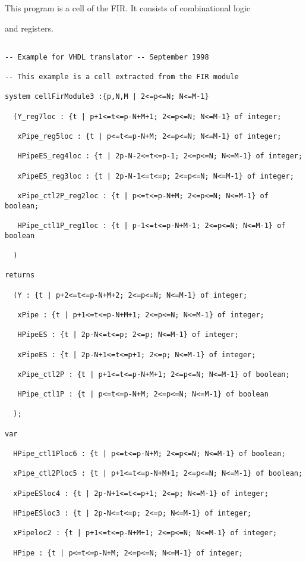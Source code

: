 This program is a cell of the FIR. It consists of combinational logic

and registers. 

\begin{verbatim}

-- Example for VHDL translator -- September 1998

-- This example is a cell extracted from the FIR module

system cellFirModule3 :{p,N,M | 2<=p<=N; N<=M-1}

  (Y_reg7loc : {t | p+1<=t<=p-N+M+1; 2<=p<=N; N<=M-1} of integer; 

   xPipe_reg5loc : {t | p<=t<=p-N+M; 2<=p<=N; N<=M-1} of integer; 

   HPipeES_reg4loc : {t | 2p-N-2<=t<=p-1; 2<=p<=N; N<=M-1} of integer;

   xPipeES_reg3loc : {t | 2p-N-1<=t<=p; 2<=p<=N; N<=M-1} of integer;

   xPipe_ctl2P_reg2loc : {t | p<=t<=p-N+M; 2<=p<=N; N<=M-1} of boolean;

   HPipe_ctl1P_reg1loc : {t | p-1<=t<=p-N+M-1; 2<=p<=N; N<=M-1} of boolean

  )

returns

  (Y : {t | p+2<=t<=p-N+M+2; 2<=p<=N; N<=M-1} of integer; 

   xPipe : {t | p+1<=t<=p-N+M+1; 2<=p<=N; N<=M-1} of integer;

   HPipeES : {t | 2p-N<=t<=p; 2<=p; N<=M-1} of integer; 

   xPipeES : {t | 2p-N+1<=t<=p+1; 2<=p; N<=M-1} of integer;

   xPipe_ctl2P : {t | p+1<=t<=p-N+M+1; 2<=p<=N; N<=M-1} of boolean;

   HPipe_ctl1P : {t | p<=t<=p-N+M; 2<=p<=N; N<=M-1} of boolean

  );

var

  HPipe_ctl1Ploc6 : {t | p<=t<=p-N+M; 2<=p<=N; N<=M-1} of boolean;

  xPipe_ctl2Ploc5 : {t | p+1<=t<=p-N+M+1; 2<=p<=N; N<=M-1} of boolean;

  xPipeESloc4 : {t | 2p-N+1<=t<=p+1; 2<=p; N<=M-1} of integer;

  HPipeESloc3 : {t | 2p-N<=t<=p; 2<=p; N<=M-1} of integer;

  xPipeloc2 : {t | p+1<=t<=p-N+M+1; 2<=p<=N; N<=M-1} of integer;

  HPipe : {t | p<=t<=p-N+M; 2<=p<=N; N<=M-1} of integer;


\end{verbatim}
